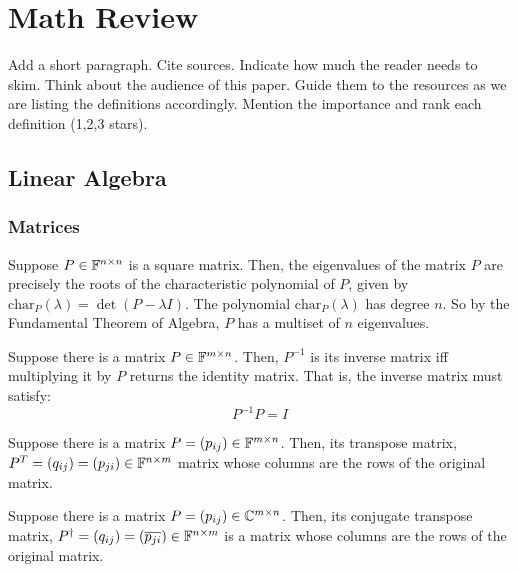 \chapter{Math Review}


Add a short paragraph. Cite sources. Indicate how much the reader needs to skim. Think about the audience of this paper. Guide them to the resources as we are listing the definitions accordingly. Mention the importance and rank each definition (1,2,3 stars). 

\section{Linear Algebra}
\subsection{Matrices}
\begin{definition}[Eigenvalue]
Suppose $P \in \mathbb{F}^{n \times n}$ is a square matrix. Then, the eigenvalues of the matrix $P$ are precisely the roots of the characteristic polynomial of $P$, given by $\text{char}_P(\lambda) = \det(P - \lambda I)$. The polynomial $\text{char}_P(\lambda)$ has degree $n$. So by the Fundamental Theorem of Algebra, $P$ has a multiset of $n$ eigenvalues.
\end{definition}


\begin{definition}
Suppose there is a matrix $P \in \mathbb{F}^{m\times n}$. Then, $P^{-1}$ is its inverse matrix iff multiplying it by $P$ returns the identity matrix. That is, the inverse matrix must satisfy:
$$ P^{-1} P = I$$
\end{definition}

\begin{definition}
Suppose there is a matrix $P = (p_{ij}) \in \mathbb{F}^{m\times n}$. Then, its transpose matrix, $P^{T} = (q_{ij}) = (p_{ji}) \in \mathbb{F}^{n\times m}$ matrix whose columns are the rows of the original matrix.
\end{definition}

\begin{definition}
Suppose there is a matrix $P = (p_{ij}) \in \mathbb{C}^{m\times n}$. Then, its conjugate transpose matrix, $P^{\dagger} = (q_{ij}) = (\overline{p_{ji}}) \in \mathbb{F}^{n\times m}$ is a matrix whose columns are the rows of the original matrix.
\end{definition}

